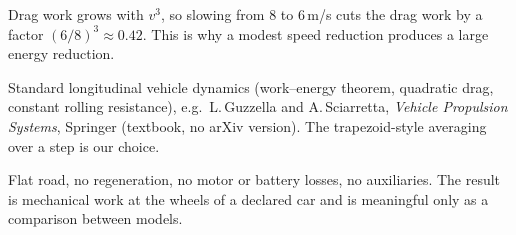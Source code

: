 \begin{description}[leftmargin=2.6cm,style=nextline]
\item[Why drag matters for the caution-aware model] Drag work grows with $v^3$, so slowing from 8 to 6\,m/s cuts the drag work by a factor $(6/8)^3\approx0.42$. This is why a modest speed reduction produces a large energy reduction.
\item[Source] Standard longitudinal vehicle dynamics (work--energy theorem, quadratic drag, constant rolling resistance), e.g.\ L.\,Guzzella and A.\,Sciarretta, \emph{Vehicle Propulsion Systems}, Springer (textbook, no arXiv version). The trapezoid-style averaging over a step is our choice.
\item[Limits] Flat road, no regeneration, no motor or battery losses, no auxiliaries. The result is mechanical work at the wheels of a declared car and is meaningful only as a comparison between models.
\end{description}

